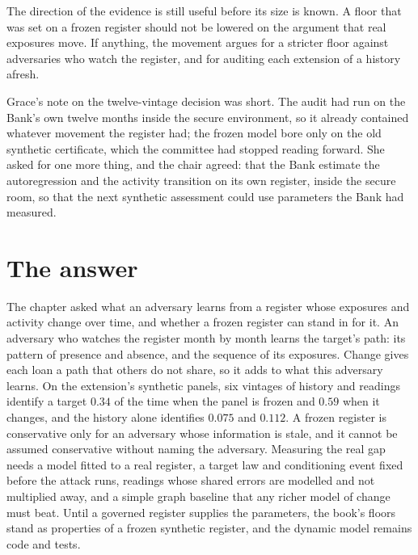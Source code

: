 The direction of the evidence is still useful before its size is known. A floor that was
set on a frozen register should not be lowered on the argument that real exposures move.
If anything, the movement argues for a stricter floor against adversaries who watch the
register, and for auditing each extension of a history afresh.

Grace's note on the twelve-vintage decision was short. The audit had run on the Bank's
own twelve months inside the secure environment, so it already contained whatever movement the register had; the frozen model bore only on the old synthetic certificate, which
the committee had stopped reading forward. She asked for one more thing, and the chair
agreed: that the Bank estimate the autoregression and the activity transition on its own register, inside the secure room, so that the next synthetic assessment could use parameters the
Bank had measured.

\section{The answer}

The chapter asked what an adversary learns from a register whose exposures and activity
change over time, and whether a frozen register can stand in for it. An adversary who
watches the register month by month learns the target's path: its pattern of presence and
absence, and the sequence of its exposures. Change gives each loan a path that others do
not share, so it adds to what this adversary learns. On the extension's synthetic panels, six
vintages of history and readings identify a target $0.34$ of the time when the panel is frozen
and $0.59$ when it changes, and the history alone identifies $0.075$ and $0.112$. A frozen register
is conservative only for an adversary whose information is stale, and it cannot be assumed
conservative without naming the adversary. Measuring the real gap needs a model fitted
to a real register, a target law and conditioning event fixed before the attack runs, readings
whose shared errors are modelled and not multiplied away, and a simple graph baseline that
any richer model of change must beat. Until a governed register supplies the parameters,
the book's floors stand as properties of a frozen synthetic register, and the dynamic model
remains code and tests.

